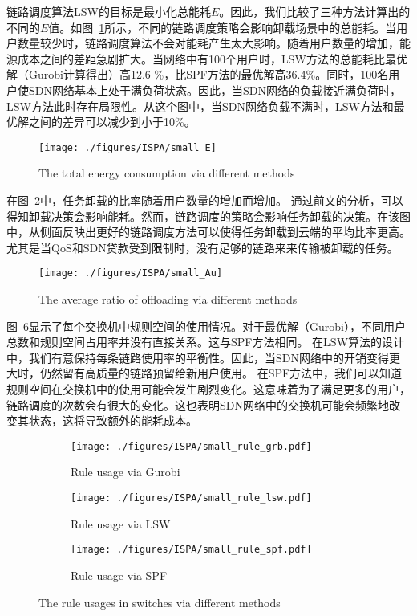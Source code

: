 链路调度算法LSW的目标是最小化总能耗$E$。因此，我们比较了三种方法计算出的不同的$E$值。如图~\ref{fig_smallE}所示，不同的链路调度策略会影响卸载场景中的总能耗。当用户数量较少时，链路调度算法不会对能耗产生太大影响。随着用户数量的增加，能源成本之间的差距急剧扩大。当网络中有100个用户时，LSW方法的总能耗比最优解（Gurobi计算得出）高12.6 \%，比SPF方法的最优解高36.4\%。同时，100名用户使SDN网络基本上处于满负荷状态。因此，当SDN网络的负载接近满负荷时，LSW方法此时存在局限性。从这个图中，当SDN网络负载不满时，LSW方法和最优解之间的差异可以减少到小于10\%。

\begin{figure}[!h]
\centering
\texttt{[image: ./figures/ISPA/small\_E]}
\vspace{-1em}
\caption{The total energy consumption via different methods}
\vspace{-0.5em}
\label{fig_smallE}
\end{figure}

在图~\ref{fig_smallAu}中，任务卸载的比率随着用户数量的增加而增加。 通过前文的分析，可以得知卸载决策会影响能耗。然而，链路调度的策略会影响任务卸载的决策。在该图中，从侧面反映出更好的链路调度方法可以使得任务卸载到云端的平均比率更高。尤其是当QoS和SDN贷款受到限制时，没有足够的链路来来传输被卸载的任务。

\begin{figure}[!h]
\centering
\texttt{[image: ./figures/ISPA/small\_Au]}
\vspace{-1em}
\caption{The average ratio of offloading via different methods}
\vspace{-1.5em}
\label{fig_smallAu}
\end{figure}

图~\ref{fig_smallrule}显示了每个交换机中规则空间的使用情况。对于最优解（Gurobi），不同用户总数和规则空间占用率并没有直接关系。这与SPF方法相同。 在LSW算法的设计中，我们有意保持每条链路使用率的平衡性。因此，当SDN网络中的开销变得更大时，仍然留有高质量的链路预留给新用户使用。 在SPF方法中，我们可以知道规则空间在交换机中的使用可能会发生剧烈变化。这意味着为了满足更多的用户，链路调度的次数会有很大的变化。这也表明SDN网络中的交换机可能会频繁地改变其状态，这将导致额外的能耗成本。

\begin{figure}[!h]
  \centering
  \begin{subfigure}[b]{0.32\linewidth}
    \texttt{[image: ./figures/ISPA/small\_rule\_grb.pdf]}
    \label{fig_smallNetworkRG}
    \caption{Rule usage via Gurobi}
  \end{subfigure}
  \begin{subfigure}[b]{0.32\linewidth}
    \texttt{[image: ./figures/ISPA/small\_rule\_lsw.pdf]}
    \label{fig_smallNetworkRL}
    \caption{Rule usage via LSW}
  \end{subfigure}
  \begin{subfigure}[b]{0.32\linewidth}
    \texttt{[image: ./figures/ISPA/small\_rule\_spf.pdf]}
    \label{fig_smallNetworkRS}
    \caption{Rule usage via SPF}
  \end{subfigure}
  \caption{The rule usages in switches via different methods}
  \label{fig_smallrule}
\end{figure}

